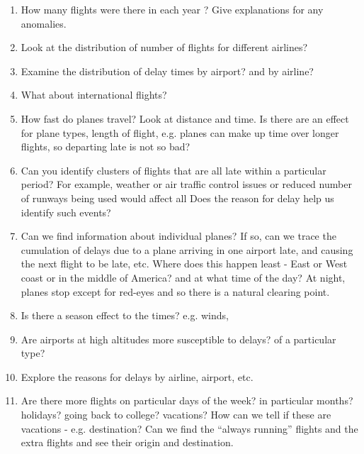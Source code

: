 \documentclass{article}
\begin{document}
\begin{enumerate}
\item How many flights were there in each year ?
Give explanations for any anomalies.
\begin{comment}
Incomplete data for 2008 because the year is not complete.
What about 1998?
Did some airlines go out of business?
come into existence?
\end{comment}

\item Look at the distribution of number of flights for different 
airlines?

\item Examine the distribution of delay times
by airport? and by airline?

\item What about international flights?

\item How fast do planes travel?
Look at distance and time.
Is there are an effect for plane types, 
length of flight, e.g. planes can make up  time
over longer flights, so departing late is not so bad?

\item Can you identify clusters of flights that are all late
within a particular period?
For example, weather or air traffic control issues
or reduced number of runways being used would
affect all 
Does the reason for delay help us identify such events?


\item Can we find information about individual planes?
If so, can we trace the cumulation of delays due to 
a plane arriving in one airport late, and causing
the next flight to be late, etc.
Where does this happen least - East or West coast or 
in the middle of America? and at what time of the
day? 
At night, planes stop except for red-eyes
and so there is a natural clearing point.

\item Is there a season effect to the times?
e.g. winds, 

\item Are airports at high altitudes more susceptible
to delays? of a particular type?

\item Explore the reasons for delays
by airline, airport, etc.

\item Are there more flights on particular days of the week?
in particular months?
 holidays? going back to college? vacations?
How can we tell if these are vacations - e.g. destination?
Can we find the ``always running'' flights and the extra flights
and see their origin and destination.


\end{enumerate}
\end{document}
